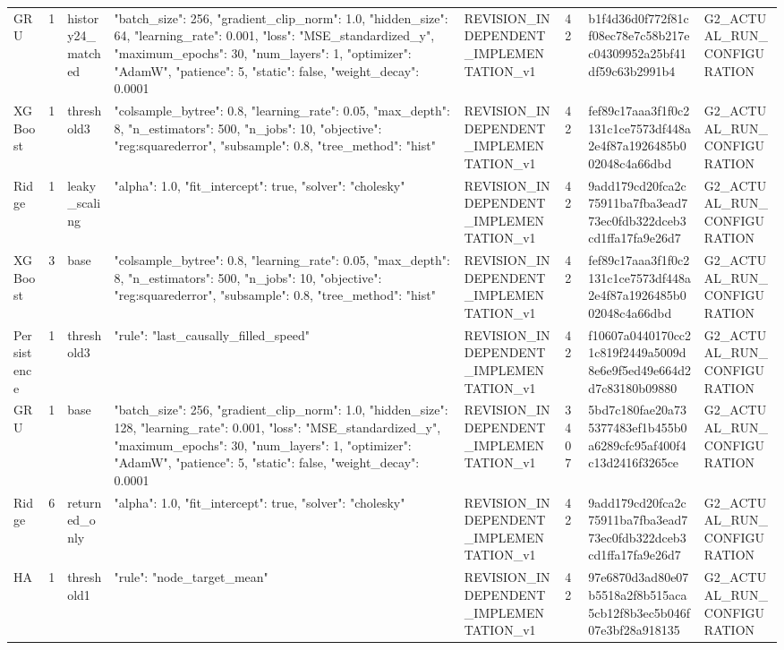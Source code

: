 \begin{longtable}{llllllll}
GRU & 1 & history24\_matched & {"batch\_size": 256, "gradient\_clip\_norm": 1.0, "hidden\_size": 64, "learning\_rate": 0.001, "loss": "MSE\_standardized\_y", "maximum\_epochs": 30, "num\_layers": 1, "optimizer": "AdamW", "patience": 5, "static": false, "weight\_decay": 0.0001} & REVISION\_INDEPENDENT\_IMPLEMENTATION\_v1 & 42 & b1f4d36d0f772f81cf08ec78e7c58b217ec04309952a25bf41df59c63b2991b4 & G2\_ACTUAL\_RUN\_CONFIGURATION \\
XGBoost & 1 & threshold3 & {"colsample\_bytree": 0.8, "learning\_rate": 0.05, "max\_depth": 8, "n\_estimators": 500, "n\_jobs": 10, "objective": "reg:squarederror", "subsample": 0.8, "tree\_method": "hist"} & REVISION\_INDEPENDENT\_IMPLEMENTATION\_v1 & 42 & fef89c17aaa3f1f0c2131c1ce7573df448a2e4f87a1926485b002048c4a66dbd & G2\_ACTUAL\_RUN\_CONFIGURATION \\
Ridge & 1 & leaky\_scaling & {"alpha": 1.0, "fit\_intercept": true, "solver": "cholesky"} & REVISION\_INDEPENDENT\_IMPLEMENTATION\_v1 & 42 & 9add179cd20fca2c75911ba7fba3ead773ec0fdb322dceb3cd1ffa17fa9e26d7 & G2\_ACTUAL\_RUN\_CONFIGURATION \\
XGBoost & 3 & base & {"colsample\_bytree": 0.8, "learning\_rate": 0.05, "max\_depth": 8, "n\_estimators": 500, "n\_jobs": 10, "objective": "reg:squarederror", "subsample": 0.8, "tree\_method": "hist"} & REVISION\_INDEPENDENT\_IMPLEMENTATION\_v1 & 42 & fef89c17aaa3f1f0c2131c1ce7573df448a2e4f87a1926485b002048c4a66dbd & G2\_ACTUAL\_RUN\_CONFIGURATION \\
Persistence & 1 & threshold3 & {"rule": "last\_causally\_filled\_speed"} & REVISION\_INDEPENDENT\_IMPLEMENTATION\_v1 & 42 & f10607a0440170cc21c819f2449a5009d8e6e9f5ed49e664d2d7c83180b09880 & G2\_ACTUAL\_RUN\_CONFIGURATION \\
GRU & 1 & base & {"batch\_size": 256, "gradient\_clip\_norm": 1.0, "hidden\_size": 128, "learning\_rate": 0.001, "loss": "MSE\_standardized\_y", "maximum\_epochs": 30, "num\_layers": 1, "optimizer": "AdamW", "patience": 5, "static": false, "weight\_decay": 0.0001} & REVISION\_INDEPENDENT\_IMPLEMENTATION\_v1 & 3407 & 5bd7c180fae20a735377483ef1b455b0a6289cfc95af400f4c13d2416f3265ce & G2\_ACTUAL\_RUN\_CONFIGURATION \\
Ridge & 6 & returned\_only & {"alpha": 1.0, "fit\_intercept": true, "solver": "cholesky"} & REVISION\_INDEPENDENT\_IMPLEMENTATION\_v1 & 42 & 9add179cd20fca2c75911ba7fba3ead773ec0fdb322dceb3cd1ffa17fa9e26d7 & G2\_ACTUAL\_RUN\_CONFIGURATION \\
HA & 1 & threshold1 & {"rule": "node\_target\_mean"} & REVISION\_INDEPENDENT\_IMPLEMENTATION\_v1 & 42 & 97e6870d3ad80e07b5518a2f8b515aca5cb12f8b3ec5b046f07e3bf28a918135 & G2\_ACTUAL\_RUN\_CONFIGURATION \\

\end{longtable}
